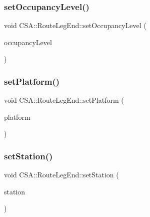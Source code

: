 \subsubsection{\texorpdfstring{set\+Occupancy\+Level()}{setOccupancyLevel()}}
{\footnotesize\ttfamily void C\+S\+A\+::\+Route\+Leg\+End\+::set\+Occupancy\+Level (\begin{DoxyParamCaption}\item[{const \mbox{\hyperlink{classCSA_1_1Vehicle_a331cc81107e5f0a8f37f894729dd9bda}{C\+S\+A\+::\+Vehicle\+::\+Occupancy\+Level}} \&}]{occupancy\+Level }\end{DoxyParamCaption})}

\mbox{\label{classCSA_1_1RouteLegEnd_abe99ad7c60f04350b460f1029ae2691d}} 
\subsubsection{\texorpdfstring{set\+Platform()}{setPlatform()}}
{\footnotesize\ttfamily void C\+S\+A\+::\+Route\+Leg\+End\+::set\+Platform (\begin{DoxyParamCaption}\item[{const Q\+String \&}]{platform }\end{DoxyParamCaption})}

\mbox{\label{classCSA_1_1RouteLegEnd_aad038e9175944c0a0b494cb8413f1bbc}} 
\subsubsection{\texorpdfstring{set\+Station()}{setStation()}}
{\footnotesize\ttfamily void C\+S\+A\+::\+Route\+Leg\+End\+::set\+Station (\begin{DoxyParamCaption}\item[{\mbox{\hyperlink{classCSA_1_1Station}{C\+S\+A\+::\+Station}} $\ast$}]{station }\end{DoxyParamCaption})}

\mbox{\label{classCSA_1_1RouteLegEnd_a20536e6606c877bc94f6093f8a0a4f1a}} 
